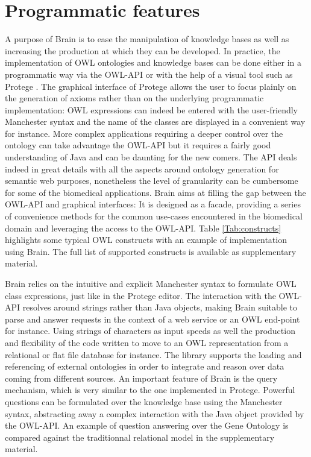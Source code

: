 \documentclass{bioinfo}
\begin{document}
\section{Programmatic features}
A purpose of Brain is to ease the manipulation of knowledge bases as well as increasing the production at which they can be developed.
In practice, the implementation of OWL ontologies and knowledge bases can be done either in a programmatic way 
via the OWL-API \citep{MatthewHorridge2011} or with the
help of a visual tool such as Protege \citep{StanfordCenterforBiomedicalInformaticsResearch}. 
The graphical interface of Protege allows the user to focus 
plainly on the generation of axioms rather than on the underlying programmatic implementation:
OWL expressions can indeed be entered 
with the user-friendly Manchester syntax and the name of the classes are displayed in a convenient way for instance. 
More complex applications requiring a deeper control over the ontology
can take advantage the OWL-API but it requires a fairly good understanding of Java and can be daunting for the new comers.
The API deals indeed in great details with all the aspects around ontology generation for semantic web purposes, nonetheless the 
level of granularity can be cumbersome for some of the biomedical applications. Brain aims at filling the gap between the OWL-API
and graphical interfaces: It is designed as a facade, providing a series of convenience methods for the common
use-cases encountered in the biomedical domain and leveraging the access to the OWL-API. 
Table \ref{Tab:constructs} highlights some typical OWL constructs 
with an example of implementation using Brain.
The full list of supported constructs is available as supplementary material.

Brain relies on the intuitive and explicit Manchester syntax to formulate OWL class expressions, just like in the Protege editor.
The interaction with the OWL-API resolves around strings rather than Java objects, making Brain suitable to parse and answer requests in 
the context of a web service or an OWL end-point for instance. Using strings of characters as input speeds as well the production 
and flexibility of the code written to move to an OWL representation from a relational or flat file database for instance.
The library supports the loading and referencing of external ontologies in order to integrate and reason
over data coming from different sources. An important feature of Brain is the query mechanism, which is very similar to 
the one implemented in Protege. Powerful questions can be formulated over the knowledge base using the Manchester syntax, abstracting
away a complex interaction with the Java object provided by the OWL-API. An example of question answering over the Gene Ontology
is compared against the traditionnal relational model in the supplementary material.
\end{document}
